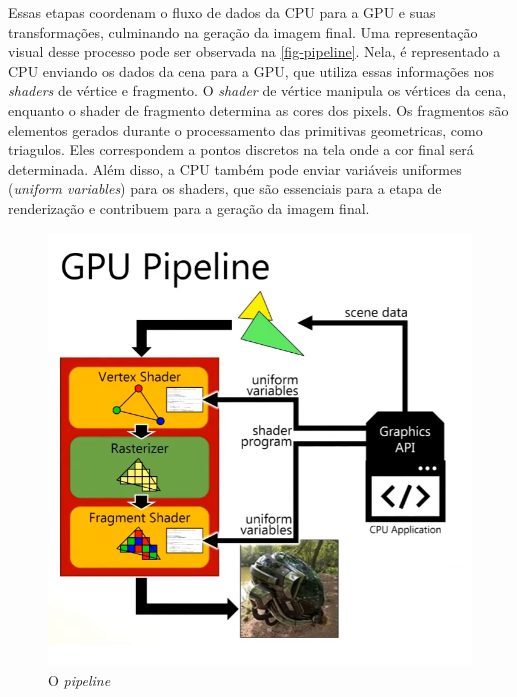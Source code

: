 \documentclass[english, 
               brazil, 
               bsc] %
               {dcomp-abntex2}
\begin{document}

Essas etapas coordenam o fluxo de dados da CPU para a GPU e suas transformações, culminando na geração da imagem final. Uma representação visual desse processo pode ser observada na \autoref{fig-pipeline}. Nela, é representado a CPU enviando os dados da cena para a GPU, que utiliza essas informações nos \textit{shaders} de vértice e fragmento. O \textit{shader} de vértice manipula os vértices da cena, enquanto o shader de fragmento determina as cores dos pixels. Os fragmentos são elementos gerados durante o processamento das primitivas geometricas, como triagulos. Eles correspondem a pontos discretos na tela onde a cor final será determinada. Além disso, a CPU também pode enviar variáveis uniformes (\textit{uniform variables}) para os shaders, que são essenciais para a etapa de renderização e contribuem para a geração da imagem final.

\begin{figure}[H]
	\caption{\label{fig-pipeline} O \textit{pipeline}}
	\begin{center}
	    \includegraphics[scale=0.45]{./Imagens/gpu_pipeline.png}
	\end{center}
\end{figure}
\end{document}
